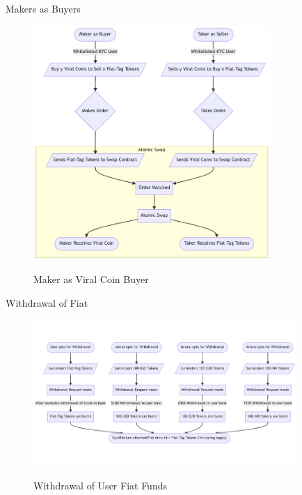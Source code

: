 \documentclass[10pt]{article}
\begin{document}
Makers as Buyers\\


\begin{figure}[H]
\begin{center}
\includegraphics[width=9cm]{maker-as-buyer}\\
\caption{Maker as Viral Coin Buyer}
\end{center}
\end{figure}

Withdrawal of Fiat\\

\begin{figure}[H]
\begin{center}
\includegraphics[width=10cm]{withdrawal}\\
\caption{Withdrawal of User Fiat Funds}
\end{center}
\end{figure}
\end{document}
